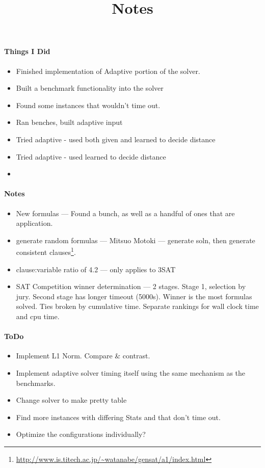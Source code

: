 \documentclass{article}
\title{Notes}
\begin{document}
\maketitle

\paragraph{Things I Did}
\begin{itemize}
\item Finished implementation of Adaptive portion of the solver.
\item Built a benchmark functionality into the solver
\item Found some instances that wouldn't time out.
\item Ran benches, built adaptive input
\item Tried adaptive - used both given and learned to decide distance
\item Tried adaptive - used learned to decide distance
\item
\end{itemize}

\paragraph{Notes}
\begin{itemize}
\item New formulas --- Found a bunch, as well as a handful of ones that are application.
\item generate random formulas --- Mitsuo Motoki --- generate soln,
then generate consistent
clauses\footnote{\url{
   http://www.is.titech.ac.jp/~watanabe/gensat/a1/index.html}}.
\item clause:variable ratio of 4.2 --- only applies to 3SAT
\item SAT Competition winner determination --- 2 stages. Stage 1, selection by
jury. Second stage has longer timeout (5000s). Winner is the most formulas
solved. Ties broken by cumulative time. Separate rankings for wall clock time
and cpu time.
\end{itemize}

\paragraph{ToDo}
\begin{itemize}
\item Implement L1 Norm. Compare \& contrast.
\item Implement adaptive solver timing itself using the same mechanism as the
benchmarks.
\item Change solver to make pretty table
\item Find more instances with differing Stats and that don't time out.
\item Optimize the configurations individually?
\end{itemize}
\end{document}
